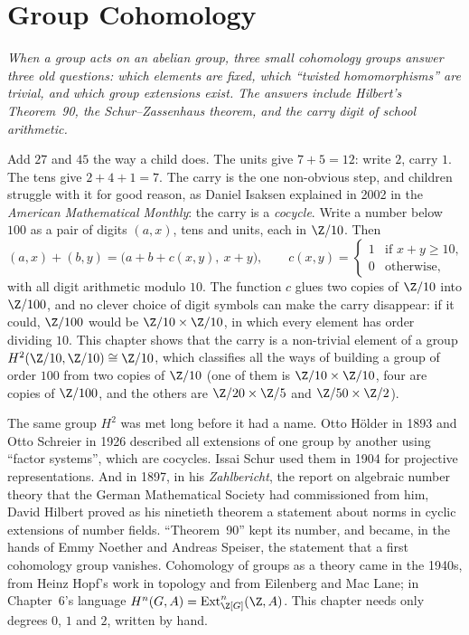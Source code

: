 \chapter{Group Cohomology}

\begin{center}\itshape
When a group acts on an abelian group, three small cohomology groups answer three old questions: which elements are fixed, which ``twisted homomorphisms'' are trivial, and which group extensions exist. The answers
include Hilbert's Theorem~90, the Schur--Zassenhaus theorem, and the carry digit of school arithmetic.
\end{center}

Add $27$ and $45$ the way a child does. The units give $7+5=12$: write $2$, carry $1$. The tens give $2+4+1=7$. The carry is the one non-obvious step, and children struggle with it for good reason, as Daniel Isaksen
explained in 2002 in the \emph{American Mathematical Monthly}: the carry is a \emph{cocycle}. Write a number below $100$ as a pair of digits $(a,x)$, tens and units, each in $\Z/10$. Then
\[
(a,x)+(b,y)=\bigl(a+b+c(x,y),\ x+y\bigr),\qquad c(x,y)=\begin{cases}1&\text{if }x+y\ge10,\\0&\text{otherwise,}\end{cases}
\]
with all digit arithmetic modulo $10$. The function $c$ glues two copies of $\Z/10$ into $\Z/100$, and no clever choice of digit symbols can make the carry disappear: if it could, $\Z/100$ would be $\Z/10\times\Z/10$, in which every
element has order dividing $10$. This chapter shows that the carry is a non-trivial element of a group $H^2(\Z/10,\Z/10)\cong\Z/10$, which classifies all the ways of building a group of order $100$ from two copies of $\Z/10$ (one of them is $\Z/10\times\Z/10$, four are copies of $\Z/100$, and the others are $\Z/20\times\Z/5$ and $\Z/50\times\Z/2$).

The same group $H^2$ was met long before it had a name. Otto Hölder in 1893 and Otto Schreier in 1926 described all extensions of one group by another using ``factor systems'', which are cocycles. Issai Schur used them
in 1904 for projective representations. And in 1897, in his \emph{Zahlbericht}, the report on algebraic number theory that the German Mathematical Society had commissioned from him, David Hilbert proved as his ninetieth
theorem a statement about norms in cyclic extensions of number fields. ``Theorem~90'' kept its number, and became, in the hands of Emmy Noether and Andreas Speiser, the statement that a first cohomology group vanishes.
Cohomology of groups as a theory came in the 1940s, from Heinz Hopf's work in topology and from Eilenberg and Mac Lane; in Chapter~6's language $H^n(G,A)=\operatorname{Ext}^n_{\Z[G]}(\Z,A)$. This chapter needs only degrees $0$, $1$ and $2$, written by hand.


